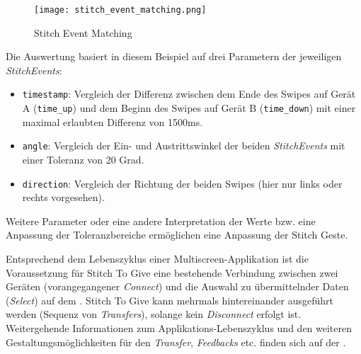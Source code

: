 {\begin{figure}[h]
\texttt{[image: stitch\_event\_matching.png]}
\caption{Stitch Event Matching}
\label{stitch_event_matching}
\end{figure}

Die Auswertung basiert in diesem Beispiel auf drei Parametern der jeweiligen \textit{StitchEvents}:
\begin{itemize}
\item \texttt{timestamp}: Vergleich der Differenz zwischen dem Ende des Swipes auf Gerät A (\texttt{time\_up}) und dem Beginn des Swipes auf Gerät B (\texttt{time\_down}) mit einer maximal erlaubten Differenz von 1500ms.
\item \texttt{angle}: Vergleich der Ein- und Austrittswinkel der beiden \textit{StitchEvents} mit einer Toleranz von 20 Grad.
\item \texttt{direction}: Vergleich der Richtung der beiden Swipes (hier nur links oder rechts vorgesehen).
\end{itemize}

Weitere Parameter oder eine andere Interpretation der Werte bzw. eine Anpassung der Toleranzbereiche ermöglichen eine Anpassung der Stitch Geste.

Entsprechend dem Lebenszyklus einer Multiscreen-Applikation ist die Voraussetzung für Stitch To Give eine bestehende Verbindung zwischen zwei Geräten (vorangegangener \textit{Connect}) und die Auswahl zu übermittelnder Daten (\textit{Select}) auf dem \sendev{}. Stitch To Give kann mehrmals hintereinander ausgeführt werden (Sequenz von \textit{Transfers}), solange kein \textit{Disconnect} erfolgt ist. \\

Weitergehende Informationen zum Applikations-Lebenszyklus und den weiteren
Gestaltungsmöglichkeiten für den \textit{Transfer}, \textit{Feedbacks} etc. finden sich
auf der \developerpage.
}

\newcommand{\authors}{Horst Schneider, Hochschule Mannheim\\
Dominick Madden, Hochschule Mannheim}
\newcommand{\versionhistory}{10.05.2017}
\newcommand{\dateofcreation}{17.09.2015}



